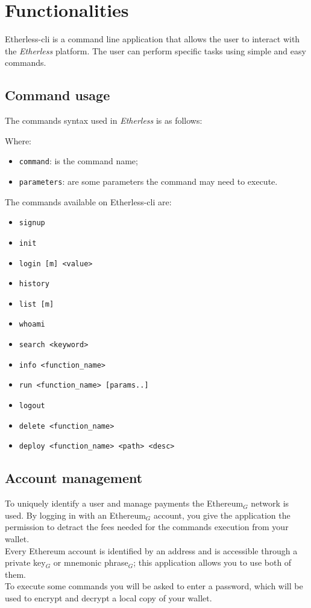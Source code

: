 \section{Functionalities}
Etherless-cli is a command line application that allows the user to interact with the \textit{Etherless} platform. The user can perform specific tasks using simple and easy commands.

\subsection{Command usage}
The commands syntax used in \textit{Etherless} is as follows:
\begin{center}
\end{center}
Where:
\begin{itemize}
	\item \texttt{command}: is the command name;
	\item \texttt{parameters}: are some parameters the command may need to execute.
\end{itemize}

\noindent The commands available on Etherless-cli are:
\begin{itemize}
	\item \texttt{signup}
	\item \texttt{init}
	\item \texttt{login [m] <value>}
	\item \texttt{history}
	\item \texttt{list [m]}
	\item \texttt{whoami}
	\item \texttt{search <keyword>}
	\item \texttt{info <function\_name>}
	\item \texttt{run <function\_name> [params..]}
	\item \texttt{logout}
	\item \texttt{delete <function\_name>}
	\item \texttt{deploy <function\_name> <path> <desc>}
\end{itemize}

\subsection{Account management}
To uniquely identify a user and manage payments the Ethereum$_{G}$ network is used. By logging in with an Ethereum$_{G}$ account, you give the application the permission to detract the fees needed for the commands execution from your wallet. \\
Every Ethereum account is identified by an address and is accessible through a private key$_{G}$ or mnemonic phrase$_{G}$; this application allows you to use both of them. \\
To execute some commands you will be asked to enter a password, which will be used to encrypt and decrypt a local copy of your wallet.

